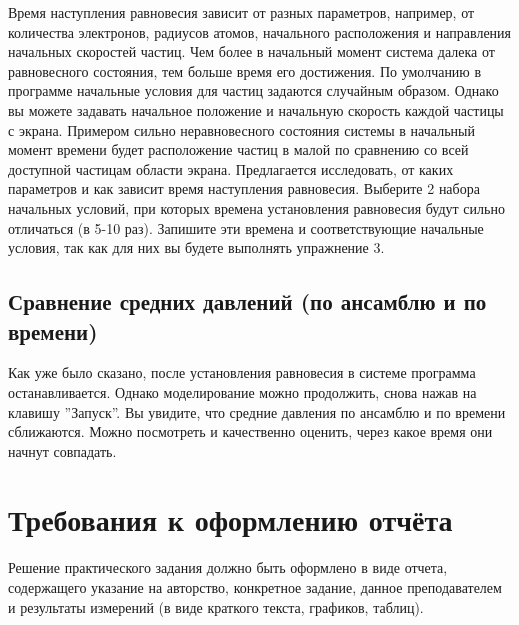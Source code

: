 \documentclass[12pt,a4paper]{scrartcl}
\begin{document}
	Время наступления равновесия зависит от разных параметров, например, от количества электронов, радиусов атомов, начального расположения и направления начальных скоростей частиц. Чем более в начальный момент система далека от равновесного состояния, тем больше время его достижения. По умолчанию в программе начальные условия для частиц задаются случайным образом. Однако вы можете задавать начальное положение и начальную скорость каждой частицы с экрана. Примером сильно неравновесного состояния системы в начальный момент времени будет расположение частиц в малой по сравнению со всей доступной частицам области экрана. Предлагается исследовать, от каких параметров и как зависит время наступления равновесия. Выберите 2 набора начальных условий, при которых времена установления равновесия будут сильно отличаться (в 5-10 раз). Запишите эти времена и соответствующие начальные условия, так как для них вы будете выполнять упражнение 3.
	
\subsection{Сравнение средних давлений (по ансамблю и по времени)}
	Как уже было сказано, после установления равновесия в системе программа останавливается. Однако моделирование можно продолжить, снова нажав на клавишу ''Запуск''. Вы увидите, что средние давления по ансамблю и по времени сближаются. Можно посмотреть и качественно оценить, через какое время они начнут совпадать.
	
    
\section{Требования к оформлению отчёта}
    Решение практического задания должно быть оформлено в виде отчета, содержащего указание на авторство, конкретное задание, данное преподавателем и результаты измерений (в виде краткого текста, графиков, таблиц).
	

\end{document}
